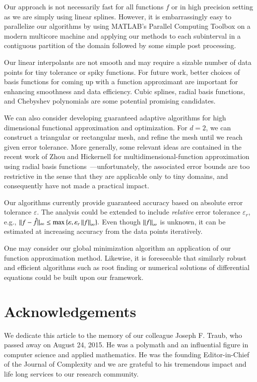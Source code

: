 \documentclass[review]{elsarticle}
\newcommand{\abstol}{\varepsilon}
\theoremstyle{definition}
\begin{document}
Our approach is not necessarily fast for all functions $f$ or in high precision
setting as we are simply using linear splines. However, it is embarrassingly
easy to parallelize our algorithms by using MATLAB's Parallel Computing Toolbox
on a modern multicore machine and applying our methods to each subinterval in a
contiguous partition of the domain followed by some simple post processing.

Our linear interpolants are not smooth and may require a sizable number of data
points for tiny tolerance or spiky functions. For future work, better choices of
basis functions for coming up with a function approximant are important for
enhancing smoothness and data efficiency. Cubic splines, radial basis functions,
and Chebyshev polynomials are some potential promising candidates.

We can also consider developing guaranteed adaptive algorithms for high
dimensional functional approximation and optimization. For $d=2$, we can
construct a triangular or rectangular mesh, and refine the mesh until we reach
given error tolerance. More generally, some relevant ideas are contained in the
recent work of Zhou and Hickernell for multidimensional-function approximation
using radial basis functions~\cite{ZhoHic15a}---unfortunately, the associated
error bounds are too restrictive in the sense that they are applicable only to
tiny domains, and consequently have not made a practical impact.

Our algorithms currently provide guaranteed accuracy based on absolute error
tolerance $\abstol$. The analysis could be extended to include \emph{relative}
error tolerance $\varepsilon_r$, e.g., $ \| f -\hat{f} \|_{\infty} \le
\max{ \{\varepsilon, \varepsilon_r \norm[\infty]{f} \} }.$ Even though
$\norm[\infty]{f}$ is unknown, it can be estimated at increasing accuracy from
the data points iteratively.

One may consider our global minimization algorithm an application of our
function approximation method. Likewise, it is foreseeable that similarly robust
and efficient algorithms such as root finding or numerical solutions of
differential equations could be built upon our framework.


\section*{Acknowledgements}

We dedicate this article to the memory of our colleague Joseph F. Traub, who
passed away on August 24, 2015. He was a polymath and an influential figure in
computer science and applied mathematics. He was the founding Editor-in-Chief of
the Journal of Complexity and we are grateful to his tremendous impact and life
long services to our research community.
\end{document}
